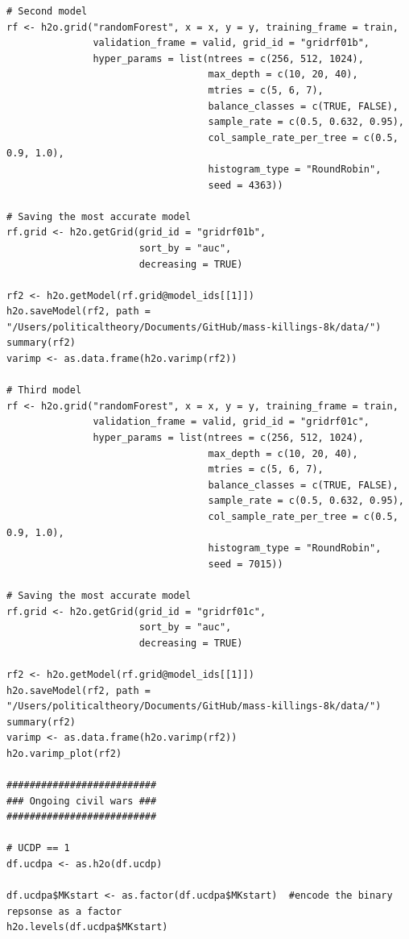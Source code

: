 \documentclass[a4paper,12pt]{article}
\begin{document}
\begin{verbatim}
# Second model
rf <- h2o.grid("randomForest", x = x, y = y, training_frame = train, 
               validation_frame = valid, grid_id = "gridrf01b",
               hyper_params = list(ntrees = c(256, 512, 1024),
                                   max_depth = c(10, 20, 40),
                                   mtries = c(5, 6, 7),
                                   balance_classes = c(TRUE, FALSE),
                                   sample_rate = c(0.5, 0.632, 0.95),
                                   col_sample_rate_per_tree = c(0.5, 0.9, 1.0),
                                   histogram_type = "RoundRobin",
                                   seed = 4363))

# Saving the most accurate model
rf.grid <- h2o.getGrid(grid_id = "gridrf01b",
                       sort_by = "auc",
                       decreasing = TRUE)

rf2 <- h2o.getModel(rf.grid@model_ids[[1]])
h2o.saveModel(rf2, path = "/Users/politicaltheory/Documents/GitHub/mass-killings-8k/data/")
summary(rf2)
varimp <- as.data.frame(h2o.varimp(rf2))

# Third model
rf <- h2o.grid("randomForest", x = x, y = y, training_frame = train, 
               validation_frame = valid, grid_id = "gridrf01c",
               hyper_params = list(ntrees = c(256, 512, 1024),
                                   max_depth = c(10, 20, 40),
                                   mtries = c(5, 6, 7),
                                   balance_classes = c(TRUE, FALSE),
                                   sample_rate = c(0.5, 0.632, 0.95),
                                   col_sample_rate_per_tree = c(0.5, 0.9, 1.0),
                                   histogram_type = "RoundRobin",
                                   seed = 7015)) 

# Saving the most accurate model
rf.grid <- h2o.getGrid(grid_id = "gridrf01c",
                       sort_by = "auc",
                       decreasing = TRUE)

rf2 <- h2o.getModel(rf.grid@model_ids[[1]])
h2o.saveModel(rf2, path = "/Users/politicaltheory/Documents/GitHub/mass-killings-8k/data/")
summary(rf2)
varimp <- as.data.frame(h2o.varimp(rf2))
h2o.varimp_plot(rf2)

##########################
### Ongoing civil wars ###
##########################

# UCDP == 1
df.ucdpa <- as.h2o(df.ucdp)

df.ucdpa$MKstart <- as.factor(df.ucdpa$MKstart)  #encode the binary repsonse as a factor
h2o.levels(df.ucdpa$MKstart)


\end{verbatim}
\end{document}

